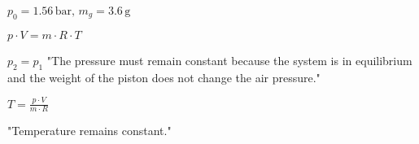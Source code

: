 \( p_0 = 1.56 \, \text{bar}, \, m_g = 3.6 \, \text{g} \)  

\( p \cdot V = m \cdot R \cdot T \)  

\( p_2 = p_1 \)  
"The pressure must remain constant because the system is in equilibrium and the weight of the piston does not change the air pressure."  

\( T = \frac{p \cdot V}{m \cdot R} \)  

"Temperature remains constant."